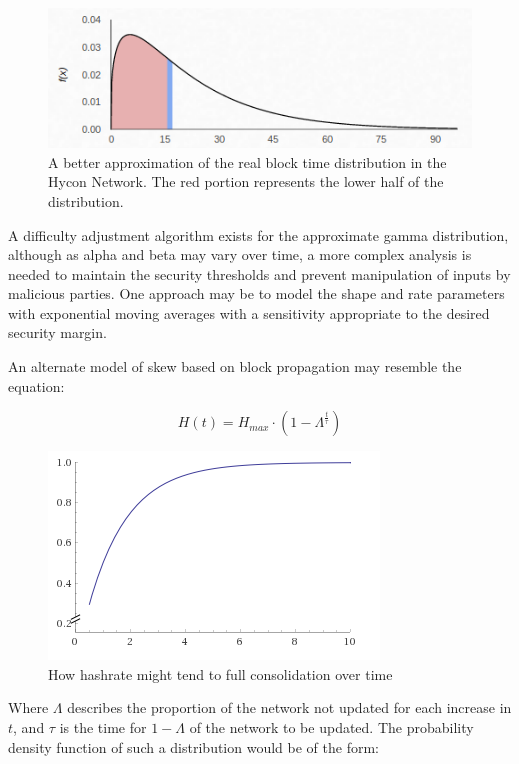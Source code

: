 \documentclass[]{article}
\begin{document}
\begin{figure}[h]
	\centering
	\includegraphics[width=0.7\linewidth]{"./real hycon"}
	\caption{\footnotesize A better approximation of the real block time distribution in the Hycon Network. The red portion represents the lower half of the distribution. \cite{GammaDistHycon}}
\end{figure}

A difficulty adjustment algorithm exists for the approximate gamma distribution, although as alpha and beta may vary over time, a more complex analysis is needed to maintain the security thresholds and prevent manipulation of inputs by malicious parties.  One approach may be to model the shape and rate parameters with exponential moving averages with a sensitivity appropriate to the desired security margin.  
\newline

\pagebreak

An alternate model of skew based on block propagation may resemble the equation: 

\begin{equation}
	H(t) = H_{max} \cdot (1 - \Lambda^\frac{t}{\tau})
\end{equation}

\begin{figure}[h]
	\centering
	\includegraphics[width=0.7\linewidth]{"./hashpower ramp"}
	\caption{\footnotesize How hashrate might tend to full consolidation over time \cite{Wolfram}}
\end{figure}

Where $\Lambda$ describes the proportion of the network not updated for each increase in $t$, and $\tau$ is the time for $1 - \Lambda$ of the network to be updated. The probability density function of such a distribution would be of the form: 
\end{document}
